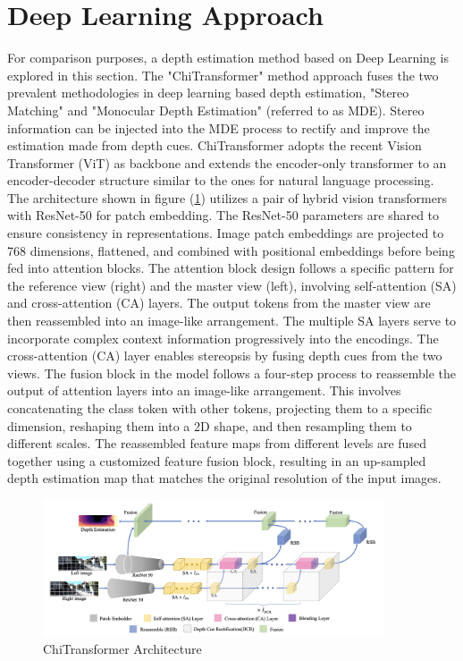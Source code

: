 \documentclass[12pt]{amsart}
\begin{document}
\section*{Deep Learning Approach}
For comparison purposes, a depth estimation method based on Deep Learning is explored in this section. The "ChiTransformer"\cite{chitransformer} method
approach fuses the two prevalent methodologies in deep learning based depth estimation, "Stereo Matching" and "Monocular Depth Estimation" (referred to as MDE). 
Stereo information can be injected into the MDE process to rectify and improve the estimation made from depth cues.
ChiTransformer adopts the recent Vision Transformer (ViT) as backbone and extends the encoder-only transformer to an encoder-decoder structure similar to
the ones for natural language processing.
The architecture shown in figure (\ref{fig:chi}) utilizes a pair of hybrid vision transformers with ResNet-50 for patch embedding. 
The ResNet-50 parameters are shared to ensure consistency in representations. 
Image patch embeddings are projected to 768 dimensions, flattened, and combined with positional embeddings before being fed into attention blocks. 
The attention block design follows a specific pattern for the reference view (right) and the master view (left), 
involving self-attention (SA) and cross-attention (CA) layers. 
The output tokens from the master view are then reassembled into an image-like arrangement.
The multiple SA layers serve to incorporate complex context information progressively into the encodings.
The cross-attention (CA) layer enables stereopsis by fusing depth cues from the two views.
The fusion block in the model follows a four-step process to reassemble the output of attention layers into an image-like arrangement. 
This involves concatenating the class token with other tokens, projecting them to a specific dimension, reshaping them into a 2D shape, and then resampling them to different scales. 
The reassembled feature maps from different levels are fused together using a customized feature fusion block, 
resulting in an up-sampled depth estimation map that matches the original resolution of the input images.
\begin{figure}[h]
    \includegraphics[width=0.9\textwidth]{Chi.png}
    \caption{ChiTransformer Architecture}
    \label{fig:chi}
\end{figure}
\end{document}
